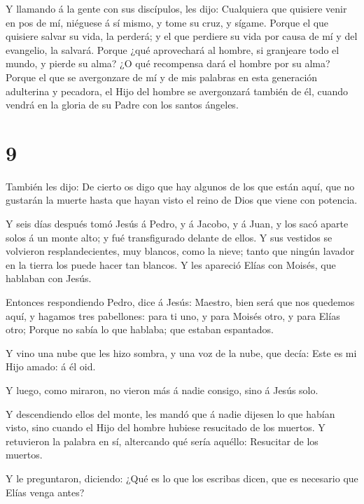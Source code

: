  Y llamando á la gente con sus discípulos, les dijo:
Cualquiera que quisiere venir en pos de mí, niéguese á sí mismo, y tome
su cruz, y sígame.  Porque el que quisiere salvar su vida,
la perderá; y el que perdiere su vida por causa de mí y del evangelio,
la salvará.  Porque ¿qué aprovechará al hombre, si
granjeare todo el mundo, y pierde su alma?  ¿O qué
recompensa dará el hombre por su alma?  Porque el que se
avergonzare de mí y de mis palabras en esta generación adulterina y
pecadora, el Hijo del hombre se avergonzará también de él, cuando vendrá
en la gloria de su Padre con los santos ángeles.

\hypertarget{section-8}{%
\section{9}\label{section-8}}

 También les dijo: De cierto os digo que hay algunos de los
que están aquí, que no gustarán la muerte hasta que hayan visto el reino
de Dios que viene con potencia.

 Y seis días después tomó Jesús á Pedro, y á Jacobo, y á
Juan, y los sacó aparte solos á un monte alto; y fué transfigurado
delante de ellos.  Y sus vestidos se volvieron
resplandecientes, muy blancos, como la nieve; tanto que ningún lavador
en la tierra los puede hacer tan blancos.  Y les apareció
Elías con Moisés, que hablaban con Jesús.

 Entonces respondiendo Pedro, dice á Jesús: Maestro, bien
será que nos quedemos aquí, y hagamos tres pabellones: para ti uno, y
para Moisés otro, y para Elías otro;  Porque no sabía lo que
hablaba; que estaban espantados.

 Y vino una nube que les hizo sombra, y una voz de la nube,
que decía: Este es mi Hijo amado: á él oid.

 Y luego, como miraron, no vieron más á nadie consigo, sino
á Jesús solo.

 Y descendiendo ellos del monte, les mandó que á nadie
dijesen lo que habían visto, sino cuando el Hijo del hombre hubiese
resucitado de los muertos.  Y retuvieron la palabra en sí,
altercando qué sería aquéllo: Resucitar de los muertos.

 Y le preguntaron, diciendo: ¿Qué es lo que los escribas
dicen, que es necesario que Elías venga antes?

